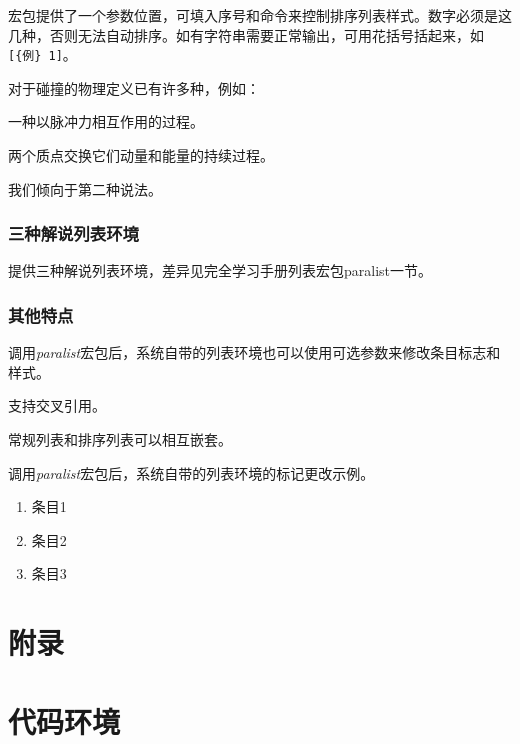 宏包提供了一个参数位置，可填入序号和命令来控制排序列表样式。数字必须是这几种，否则无法自动排序。如有字符串需要正常输出，可用花括号括起来，如\verb|[{例} 1]|。

\begin{codeshow}
	对于碰撞的物理定义已有许多种，例如：
	\begin{compactenum}[{定义} \itshape (1)]
		\item 一种以脉冲力相互作用的过程。
		\item 两个质点交换它们动量和能量的持续过程。
	\end{compactenum}
	我们倾向于第二种说法。
\end{codeshow}

\subsubsection{三种解说列表环境}
提供三种解说列表环境，差异见\LaTeXe 完全学习手册列表宏包paralist一节。

\subsubsection{其他特点}
\begin{asparaenum}[(1)]
	\item 调用\emph{paralist}宏包后，系统自带的列表环境也可以使用可选参数来修改条目标志和样式。
	\item 支持交叉引用。
	\item 常规列表和排序列表可以相互嵌套。
\end{asparaenum}

\begin{codeshow}
	调用\emph{paralist}宏包后，系统自带的列表环境的标记更改示例。
	\begin{enumerate}[(1)]
		\itemsep=0pt
		\parskip=0pt
		\item 条目1
		\item 条目2
		\item 条目3
		\end{enumerate}
\end{codeshow}

\section{附录}

\section{代码环境}

